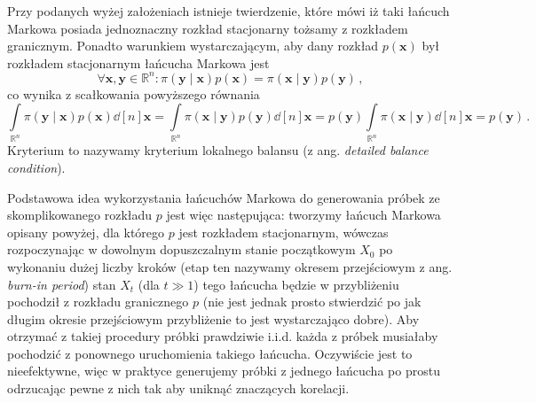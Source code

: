 \documentclass{myclass}
\begin{document}
Przy podanych wyżej założeniach istnieje twierdzenie, które mówi iż taki łańcuch Markowa posiada
jednoznaczny rozkład stacjonarny tożsamy z rozkładem granicznym. Ponadto warunkiem wystarczającym,
aby dany rozkład \(p(\mathbf{x})\) był rozkładem stacjonarnym łańcucha Markowa jest
\begin{equation*}
    \forall\mathbf{x}, \mathbf{y} \in \mathbb{R}^n: \pi(\mathbf{y}\mid\mathbf{x}) p(\mathbf{x}) = \pi(\mathbf{x} \mid \mathbf{y}) p(\mathbf{y})\,,
\end{equation*}
co wynika z scałkowania powyższego równania
\begin{equation*}
    \int\limits_{\mathbb{R}^n} \pi(\mathbf{y}\mid\mathbf{x}) p(\mathbf{x}) \dd[n]{\mathbf{x}} = \int\limits_{\mathbb{R}^n} \pi(\mathbf{x} \mid \mathbf{y}) p(\mathbf{y}) \dd[n]{\mathbf{x}} = p(\mathbf{y}) \int\limits_{\mathbb{R}^n} \pi(\mathbf{x} \mid \mathbf{y}) \dd[n]{\mathbf{x}} = p(\mathbf{y})\,.
\end{equation*}
Kryterium to nazywamy kryterium lokalnego balansu (z ang. \textit{detailed balance condition}).

Podstawowa idea wykorzystania łańcuchów Markowa do generowania próbek ze skomplikowanego rozkładu
\(p\) jest więc następująca: tworzymy łańcuch Markowa opisany powyżej, dla którego \(p\) jest
rozkładem stacjonarnym, wówczas rozpoczynając w dowolnym dopuszczalnym stanie początkowym \(X_0\) po
wykonaniu dużej liczby kroków (etap ten nazywamy okresem przejściowym z ang. \textit{burn-in
period}) stan \(X_t\) (dla \(t \gg 1\)) tego łańcucha będzie w przybliżeniu pochodził z rozkładu
granicznego \(p\) (nie jest jednak prosto stwierdzić po jak długim okresie przejściowym przybliżenie
to jest wystarczająco dobre). Aby otrzymać z takiej procedury próbki prawdziwie i.i.d. każda z
próbek musiałaby pochodzić z ponownego uruchomienia takiego łańcucha. Oczywiście jest to
nieefektywne, więc w praktyce generujemy próbki z jednego łańcucha po prostu odrzucając pewne z nich
tak aby uniknąć znaczących korelacji.
\end{document}
